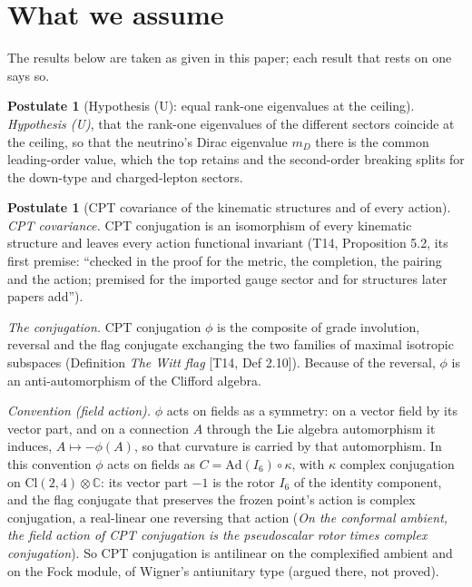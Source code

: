 \documentclass[11pt]{article}
\theoremstyle{definition}
\newtheorem{postulate}[theorem]{Postulate}
\theoremstyle{plain}
\providecommand{\C}{}\renewcommand{\C}{\mathbb{C}}
\providecommand{\Cl}{}\renewcommand{\Cl}{\mathrm{Cl}}
\begin{document}
\section*{What we assume}
The results below are taken as given in this paper; each result that rests on one says so.
\begin{postulate}[Hypothesis (U): equal rank-one eigenvalues at the ceiling]\label{c:dark-matter.hyp-u-equal-rank-one-eigenvalues}
\emph{Hypothesis (U)}, that the rank-one eigenvalues of the different sectors coincide at the ceiling, so that the neutrino's Dirac eigenvalue $m_{D}$ there is the common leading-order value, which the top retains and the second-order breaking splits for the down-type and charged-lepton sectors.
\end{postulate}

\begin{postulate}[CPT covariance of the kinematic structures and of every action]\label{c:dark-matter.premise-cpt-covariance}
\emph{CPT covariance.} CPT conjugation is an isomorphism of every kinematic structure and leaves every action functional invariant (T14, Proposition 5.2, its first premise: ``checked in the proof for the metric, the completion, the pairing and the action; premised for the imported gauge sector and for structures later papers add'').

\emph{The conjugation.} CPT conjugation $\phi$ is the composite of grade involution, reversal and the flag conjugate exchanging the two families of maximal isotropic subspaces (Definition \emph{The Witt flag} [T14, Def 2.10]). Because of the reversal, $\phi$ is an anti-automorphism of the Clifford algebra.

\emph{Convention (field action).} $\phi$ acts on fields as a symmetry: on a vector field by its vector part, and on a connection $A$ through the Lie algebra automorphism it induces, $A \mapsto -\phi(A)$, so that curvature is carried by that automorphism. In this convention $\phi$ acts on fields as $C = \mathrm{Ad}(I_{6}) \circ \kappa$, with $\kappa$ complex conjugation on $\Cl(2,4) \otimes \C$: its vector part $-1$ is the rotor $I_{6}$ of the identity component, and the flag conjugate that preserves the frozen point's action is complex conjugation, a real-linear one reversing that action (\emph{On the conformal ambient, the field action of CPT conjugation is the pseudoscalar rotor times complex conjugation}). So CPT conjugation is antilinear on the complexified ambient and on the Fock module, of Wigner's antiunitary type (argued there, not proved).


\end{postulate}
\end{document}
